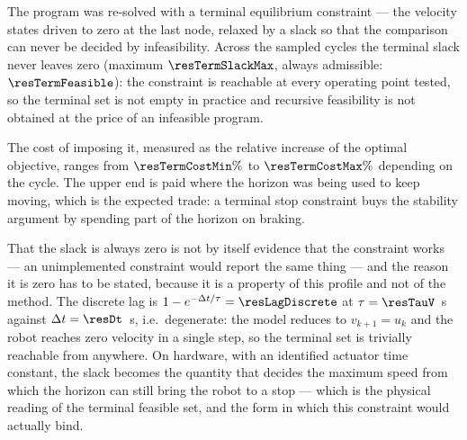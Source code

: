 \begin{table}[htbp]
  \centering
  \small
  \caption{Residual constraint violation against the penalty weight, for the non-smooth and the smooth relaxation of the same distance constraint. Bold: the violations that are exactly zero, which is the result the exact-penalty theorem predicts and the smooth relaxation never attains. Zero entries are below the solver tolerance of $1\times 10^{-8}$~m.}
  \label{res:tab:penalty}
\end{table}

\label{res:terminal}


The program was re-solved with a terminal equilibrium constraint --- the velocity states driven to zero at the last node, relaxed by a slack so that the comparison can never be decided by infeasibility. Across the sampled cycles the terminal slack never leaves zero (maximum $\resTermSlackMax$, always admissible: $\resTermFeasible$): the constraint is reachable at every operating point tested, so the terminal set is not empty in practice and recursive feasibility is not obtained at the price of an infeasible program.

The cost of imposing it, measured as the relative increase of the optimal objective, ranges from $\resTermCostMin\%$ to $\resTermCostMax\%$ depending on the cycle. The upper end is paid where the horizon was being used to keep moving, which is the expected trade: a terminal stop constraint buys the stability argument by spending part of the horizon on braking.

That the slack is always zero is not by itself evidence that the constraint works --- an unimplemented constraint would report the same thing --- and the reason it is zero has to be stated, because it is a property of this profile and not of the method. The discrete lag is $1-e^{-\Delta t/\tau}=\resLagDiscrete$ at $\tau=\resTauV$~s against $\Delta t=\resDt$~s, i.e.\ degenerate: the model reduces to $v_{k+1}=u_k$ and the robot reaches zero velocity in a single step, so the terminal set is trivially reachable from anywhere. On hardware, with an identified actuator time constant, the slack becomes the quantity that decides the maximum speed from which the horizon can still bring the robot to a stop --- which is the physical reading of the terminal feasible set, and the form in which this constraint would actually bind.

